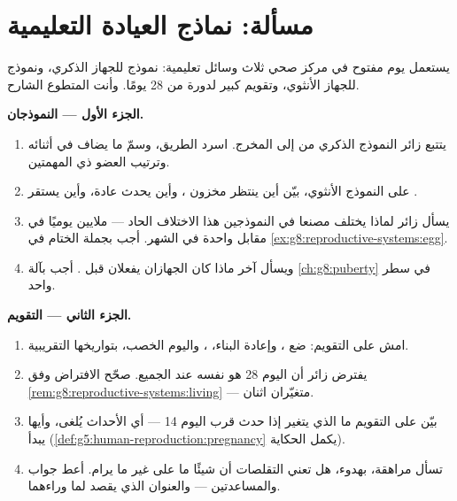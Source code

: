 \section{مسألة: نماذج العيادة التعليمية}

\begin{problem}\label{pb:g8:reproductive-systems:1}
يستعمل يوم مفتوح في مركز صحي ثلاث وسائل تعليمية: نموذج
للجهاز الذكري، ونموذج للجهاز الأنثوي، وتقويم كبير لدورة
من 28 يومًا. وأنت المتطوع الشارح.

\medskip\noindent\textbf{الجزء الأول --- النموذجان.}
\begin{enumerate}
  \item يتتبع زائر النموذج الذكري من  إلى المخرج.
        اسرد الطريق، وسمّ ما يضاف في أثنائه وترتيب العضو
        ذي المهمتين.
  \item على النموذج الأنثوي، بيّن أين ينتظر مخزون
        ، وأين يحدث  عادة، وأين يستقر
        .
  \item يسأل زائر لماذا يختلف مصنعا  في النموذجين
        هذا الاختلاف الحاد --- ملايين يوميًا في مقابل
        واحدة في الشهر. أجب بجملة الختام في
        \cref{ex:g8:reproductive-systems:egg}.
  \item ويسأل آخر ماذا كان الجهازان يفعلان قبل .
        أجب بآلة \cref{ch:g8:puberty} في سطر واحد.
\end{enumerate}

\medskip\noindent\textbf{الجزء الثاني --- التقويم.}
\begin{enumerate}[resume]
  \item امش على التقويم: ضع ، وإعادة البناء،
        ، واليوم الخصب، بتواريخها التقريبية.
  \item يفترض زائر أن اليوم 28 هو نفسه عند الجميع. صحّح
        الافتراض وفق \cref{rem:g8:reproductive-systems:living}
        --- متغيّران اثنان.
  \item بيّن على التقويم ما الذي يتغير إذا حدث 
        قرب اليوم 14 --- أي الأحداث يُلغى، وأيها يبدأ
        (\cref{def:g5:human-reproduction:pregnancy} يكمل
        الحكاية).
  \item تسأل مراهقة، بهدوء، هل تعني التقلصات أن شيئًا ما
        على غير ما يرام. أعط جواب  والمساعدتين ---
        والعنوان الذي يقصد لما وراءهما.
\end{enumerate}


\end{problem}
